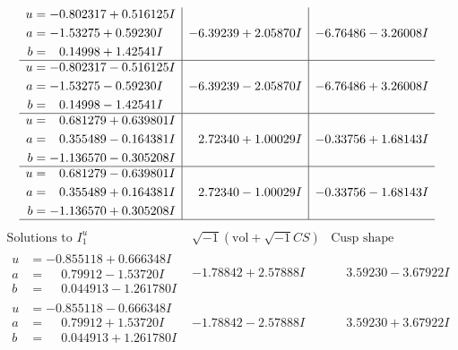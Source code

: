\documentclass[1p]{elsarticle_modified}
\theoremstyle{definition}
\newcommand{\I}{\sqrt{-1}}
\begin{document}
$$\begin{array}{c|c|c}
\begin{aligned}
u &= -0.802317 + 0.516125 I \\
a &= -1.53275 + 0.59230 I \\
b &= \phantom{-}0.14998 + 1.42541 I\end{aligned}
 & -6.39239 + 2.05870 I & -6.76486 - 3.26008 I \\ \hline\begin{aligned}
u &= -0.802317 - 0.516125 I \\
a &= -1.53275 - 0.59230 I \\
b &= \phantom{-}0.14998 - 1.42541 I\end{aligned}
 & -6.39239 - 2.05870 I & -6.76486 + 3.26008 I \\ \hline\begin{aligned}
u &= \phantom{-}0.681279 + 0.639801 I \\
a &= \phantom{-}0.355489 - 0.164381 I \\
b &= -1.136570 - 0.305208 I\end{aligned}
 & \phantom{-}2.72340 + 1.00029 I & -0.33756 + 1.68143 I \\ \hline\begin{aligned}
u &= \phantom{-}0.681279 - 0.639801 I \\
a &= \phantom{-}0.355489 + 0.164381 I \\
b &= -1.136570 + 0.305208 I\end{aligned}
 & \phantom{-}2.72340 - 1.00029 I & -0.33756 - 1.68143 I\\
 \hline 
 \end{array}$$\newpage$$\begin{array}{c|c|c}  
\text{Solutions to }I^u_{1}& \I (\text{vol} + \sqrt{-1}CS) & \text{Cusp shape}\\
 \hline 
\begin{aligned}
u &= -0.855118 + 0.666348 I \\
a &= \phantom{-}0.79912 - 1.53720 I \\
b &= \phantom{-}0.044913 - 1.261780 I\end{aligned}
 & -1.78842 + 2.57888 I & \phantom{-}3.59230 - 3.67922 I \\ \hline\begin{aligned}
u &= -0.855118 - 0.666348 I \\
a &= \phantom{-}0.79912 + 1.53720 I \\
b &= \phantom{-}0.044913 + 1.261780 I\end{aligned}
 & -1.78842 - 2.57888 I & \phantom{-}3.59230 + 3.67922 I \\ \hline\begin{aligned}

\end{aligned}
\end{array}$$
\end{document}
